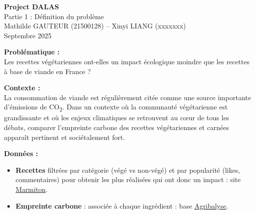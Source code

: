 \documentclass[11pt,a4paper]{article}
\begin{document}
\begin{center}
    {\LARGE \textbf{Project DALAS}}\\[0.3cm]
    {\large Partie 1 : Définition du problème}\\[0.5cm]
    Mathilde GAUTEUR (21500128) --  Xinyi LIANG (xxxxxxx)\\
    Septembre 2025
\end{center}

\vspace{0.5cm}

\noindent\textbf{Problématique :}  \\
Les recettes végétariennes ont-elles un impact écologique moindre que les recettes à base de viande en France ?  

\vspace{0.3cm}
\noindent\textbf{Contexte :}  \\
La consommation de viande est régulièrement citée comme une source importante d’émissions de CO\textsubscript{2}. Dans un contexte où la communauté végétarienne est grandissante et où les enjeux climatiques se retrouvent au cœur de tous les débats, comparer l’empreinte carbone des recettes végétariennes et carnées apparaît pertinent et sociétalement fort.

\vspace{0.3cm}
\noindent\textbf{Données :} 
\begin{itemize}[leftmargin=1.2cm, itemsep=0pt]
    \item \textbf{Recettes} filtrées par catégorie (végé vs non-végé) et par popularité (likes, commentaires) pour obtenir les plus réalisées qui ont donc un impact : site \href{https://www.marmiton.org/}{Marmiton}.
    \item \textbf{Empreinte carbone} : associée à chaque ingrédient : base \href{https://agribalyse.ademe.fr/app}{Agribalyse}.
\end{itemize}
\end{document}
